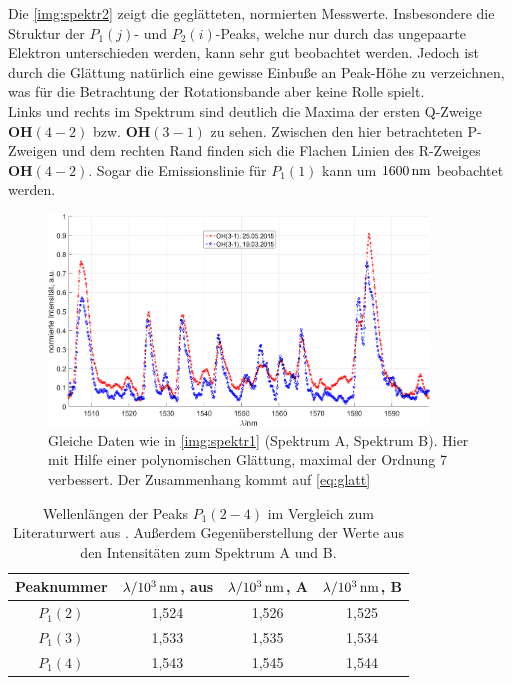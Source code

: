 \documentclass[numbers=noenddot,a4paper,notitlepage,twoside,BCOR15mm]{scrartcl}
\newcommand{\tenpo}[1]{ 10^{#1}}
\newcommand{\ix}[1]{_\text{#1}}
\newcommand{\fett}[1]{\textbf{#1}}
\begin{document}
	Die \autoref{img:spektr2} zeigt die geglätteten, normierten Messwerte. Insbesondere die Struktur der $P\ix{1}(j)$- und $P\ix{2}(i)$-Peaks, welche nur durch das ungepaarte Elektron unterschieden werden, kann sehr gut beobachtet werden. Jedoch ist durch die Glättung natürlich eine gewisse Einbuße an Peak-Höhe zu verzeichnen, was für die Betrachtung der Rotationsbande aber keine Rolle spielt.\\
	Links und rechts im Spektrum sind deutlich die Maxima der ersten Q-Zweige $\fett{OH}(4-2)$ bzw. $\fett{OH}(3-1)$ zu sehen. Zwischen den hier betrachteten P-Zweigen und dem rechten Rand finden sich die Flachen Linien des R-Zweiges $\fett{OH}(4-2)$. Sogar die Emissionslinie für $P\ix{1}(1)$ kann um $\unit[1600]{nm}$ beobachtet werden.
	
	\begin{figure}[h]
		\centering
		\includegraphics[width=0.9\textwidth]{spektr_smooth.png}
		\caption{Gleiche Daten wie in \autoref{img:spektr1} (Spektrum A, Spektrum B). Hier mit Hilfe einer polynomischen Glättung, maximal der Ordnung 7 verbessert. Der Zusammenhang kommt auf \autoref{eq:glatt}}
		\label{img:spektr2}
	\end{figure}
	
	\begin{table}[h]
		\centering
		\begin{tabular}{c|c|c|c}
			Peaknummer & $\lambda/\unit[\tenpo{3}]{nm}$, aus \cite{EMAUGreifswaldOHRot} & $\lambda/\unit[\tenpo{3}]{nm}$, A & $\lambda/\unit[\tenpo{3}]{nm}$, B\\
			\hline $P\ix{1}(2)$ & 1,524 & 1,526 & 1,525 \\
			\hline $P\ix{1}(3)$ & 1,533 & 1,535 & 1,534 \\
			\hline $P\ix{1}(4)$ & 1,543 & 1,545 & 1,544
		\end{tabular}
		\caption{Wellenlängen der Peaks $P\ix{1}(2-4)$ im Vergleich zum Literaturwert aus \cite{EMAUGreifswaldOHRot}. Außerdem Gegenüberstellung der Werte aus den Intensitäten zum Spektrum A und B.}
		\label{tab:wellen}
	\end{table}
	
\end{document}

